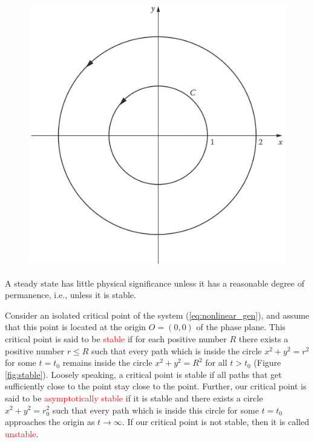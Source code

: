 \documentclass[12pt,a4paper]{article}
\begin{document}
\begin{figure}
\centering
\includegraphics[height=9.cm, angle=0]{spiral.eps}
\caption{
}
\label{fig:spiral}
\end{figure}


A steady state has little physical significance unless it has a reasonable degree of permanence, i.e., unless it is stable. 

Consider an isolated critical point of the system (\ref{eq:nonlinear_gen}), and assume that this point is located at the origin $O=(0,0)$ of the phase plane. This critical point is said to be \textcolor{red}{stable} if for each positive number $R$ there exists a positive number $r \leqslant R$ such that every path which is inside the circle $x^2 +y^2 = r^2$ for some $t=t_0$ remains inside the circle $x^2 +y^2 =R^2$ for all $t > t_0$ (Figure \ref{fig:stable}). Loosely speaking, a critical point is stable if all paths that get sufficiently close to the point stay close to the point. Further, our critical point is said to be  \textcolor{red}{asymptotically stable} if it is stable and there exists a circle $x^2 + y^2 = r_0^2$ such that every path which is inside this circle for some $t = t_0$ approaches the origin as $t \rightarrow \infty$. If our critical point is not stable, then it is called \textcolor{red}{unstable}.
\end{document}
